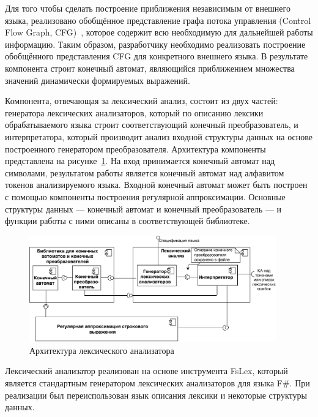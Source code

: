 Для того чтобы сделать построение приближения независимым от внешнего языка, реализовано обобщённое представление графа потока управления (Control Flow Graph, CFG)~\cite{Dragon}, которое содержит всю необходимую для дальнейшей работы информацию. Таким образом, разработчику необходимо реализовать построение обобщённого представления CFG для конкретного внешнего языка. В результате компонента строит конечный автомат, являющийся приближением множества значений динамически формируемых выражений.

Компонента, отвечающая за лексический анализ, состоит из двух частей: генератора лексических анализаторов, который по описанию лексики обрабатываемого языка строит соответствующий конечный преобразователь, и интерпретатора, который производит анализ входной структуры данных на основе построенного генератором преобразователя. Архитектура компоненты представлена на рисунке~\ref{fig:LexArch}. На вход принимается конечный автомат над символами, результатом работы является конечный автомат над алфавитом токенов анализируемого языка. Входной конечный автомат может быть построен с помощью компоненты построения регулярной аппроксимации. Основные структуры данных --- конечный автомат и конечный преобразователь --- и функции работы с ними описаны в соответствующей библиотеке.

\begin{figure}[h!]
\begin{center}
\includegraphics[width=0.95\textwidth]{pics/LexerDiagram}
\caption{Архитектура лексического анализатора}
\label{fig:LexArch} 
\end{center}
\end{figure}

Лексический анализатор реализован на основе инструмента FsLex, который является стандартным генератором лексических анализаторов для языка F\#. При реализации был переиспользован язык описания лексики и некоторые структуры данных.

